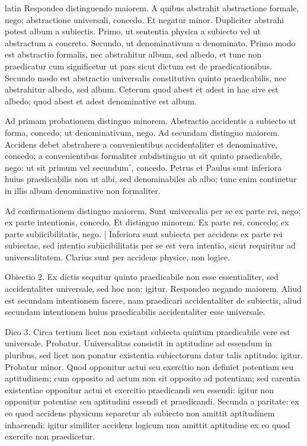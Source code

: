 \begin{otherlanguage*}{latin}
\pstart
Respondeo distinguendo maiorem. A quibus abstrahit abstractione formale, nego; abstractione universali, concedo. Et negatur minor. Dupliciter abstrahi potest album a subiectis. Primo, ut sententia physica a subiecto vel ut abstractum a concreto. Secundo, ut denominativum a denominato. Primo modo est abstractio formalis, nec abstrahitur album, sed albedo, et tunc non praedicatur cum significetur ut pars sicut dictum est de praedicationibus. Secundo modo est abstractio universalis constitutiva quinto praedicabilis, nec abstrahitur albedo, sed album. Ceterum quod abest et adest in hae sive est albedo; quod abest et adest denominative est album. 
\pend

\pstart
Ad primam probationem distinguo minorem. Abstractio accidentis a subiecto ut forma, concedo; ut denominativum, nego. Ad secundam distinguo maiorem. Accidens debet abstrahere a convenientibus accidentaliter et denominative, concedo; a convenientibus formaliter subdistinguo ut sit quinto praedicabile, nego:
ut sit primum vel secundum΄, concedo. Petrus et Paulus sunt inferiora huius praedicabilis non ut albi, sed denominabiles ab albo; tunc enim continetur in illis album denominative non formaliter. 
\pend

\pstart
Ad confirmationem distinguo maiorem. Sunt universalia per se ex parte rei, nego; ex parte intentionis, concedo. Et distinguo minorem. Ex parte rei, concedo; ex parte subiicibilitatis, nego. \textnormal{|} Inferiora sunt subiecta per accidens ex parte rei subiectae, sed intentio subiicibilitatis per se est vera intentio, sicut requiritur ad universalitatem. Clarius sunt per accidens physice, non logice. 
\pend

\pstart
Obiectio 2. Ex dictis sequitur quinto praedicabile non esse essentialiter, sed accidentaliter universale, sed hoc non:
igitur. Respondeo negando maiorem. Aliud est secundam intentionem facere, nam praedicari accidentaliter de subiectis, aliud secundam intentionem huius praedicabilis accidentaliter esse universale. 
\pend

\pstart
Dico 3. Circa tertium licet non existant subiecta quintum praedicabile vere est universale. Probatur. Universalitas consistit in aptitudine ad essendum in pluribus, sed licet non ponatur existentia subiectorum datur talis aptitudo:
igitur. Probatur minor. Quod opponitur actui seu exercitio non definiet potentiam seu aptitudinem; cum opposito ad actum non sit opposito ad potentiam; sed carentia existentiae opponitur actui et exercitio praedicandi seu essendi:
igitur non opponitur potentiae seu aptitudini essendi et praedicandi. Secunda a paritate:
ex eo quod accidens physicum separetur ab subiecto non amittit aptitudinem inhaerendi:
igitur similiter accidens logicum non amittit aptitudine ex eo quod exercite non praedicetur. 
\pend


\end{otherlanguage*}
